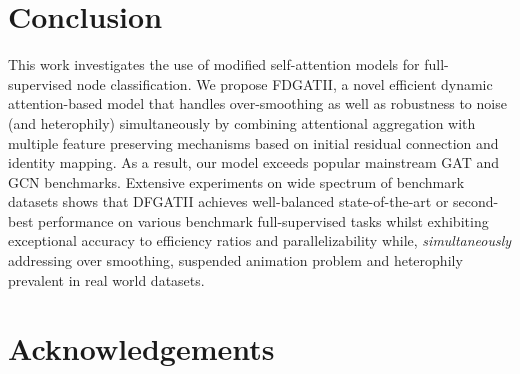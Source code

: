 \documentclass{article}
\begin{document}
\section{Conclusion}
This work investigates the use of modified self-attention models for full-supervised node classification. We propose FDGATII, a novel efficient  dynamic attention-based model that handles over-smoothing as well as robustness to noise (and heterophily) simultaneously by combining attentional aggregation with multiple feature preserving mechanisms based on initial residual connection and identity mapping. As a result, our model exceeds popular mainstream GAT and GCN benchmarks. Extensive experiments on wide spectrum of benchmark datasets shows that DFGATII achieves well-balanced state-of-the-art or second-best performance on various benchmark full-supervised tasks whilst exhibiting exceptional accuracy to efficiency ratios and parallelizability while, \textit{simultaneously} addressing over smoothing, suspended animation problem and heterophily prevalent in real world datasets.

\section*{Acknowledgements}



\end{document}
